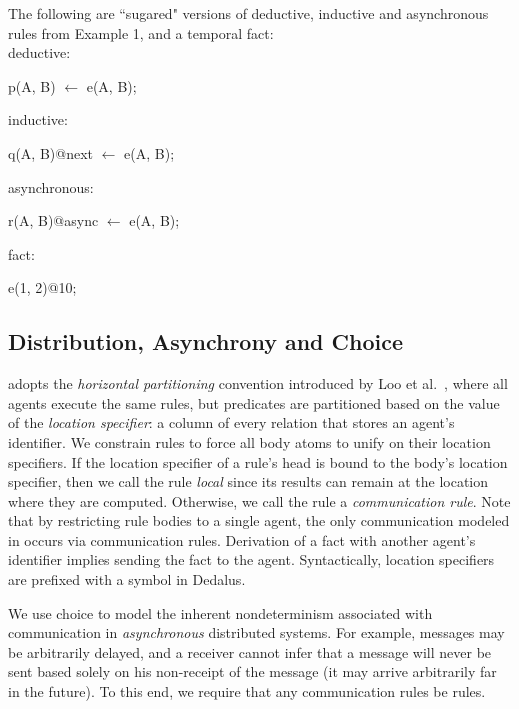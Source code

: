 \begin{example}
The following are ``sugared" versions of deductive, inductive and asynchronous rules from Example 1, and a temporal fact:
\\
deductive:
\begin{Dedalus}
p(A, B) \(\leftarrow\) e(A, B);
\end{Dedalus}
inductive:
\begin{Dedalus}
q(A, B)@next \(\leftarrow\) e(A, B);
\end{Dedalus}
asynchronous:
\begin{Dedalus}
r(A, B)@async \(\leftarrow\) e(A, B);
\end{Dedalus}
fact:
\begin{Dedalus}
e(1, 2)@10;
\end{Dedalus}

\end{example}

\subsection{Distribution, Asynchrony and Choice}

\lang adopts the {\em horizontal partitioning} convention introduced by Loo et
al.~\cite{Loo:2005}, where all agents execute the same rules, but predicates
are partitioned based on the value of the {\em location specifier}: a column of
every relation that stores an agent's identifier.  We constrain \lang rules to
force all body atoms to unify on their location specifiers.  If the location
specifier of a rule's head is bound to the body's location specifier, then we
call the rule {\em local} since its results can remain at the location where
they are computed.  Otherwise, we call the rule a {\em communication rule}.
Note that by restricting rule bodies to a single agent, the only communication
modeled in \lang occurs via communication rules.  Derivation of a fact with
another agent's identifier implies sending the fact to the agent.
Syntactically, location specifiers are prefixed with a \dedalus{\#} symbol in
Dedalus.

We use choice to model the inherent nondeterminism associated with
communication in {\em asynchronous} distributed systems.  For example, messages
may be arbitrarily delayed, and a receiver cannot infer that a message will
never be sent based solely on his non-receipt of the message (it may arrive
arbitrarily far in the future).
To this end, we require that any communication rules be  rules.

